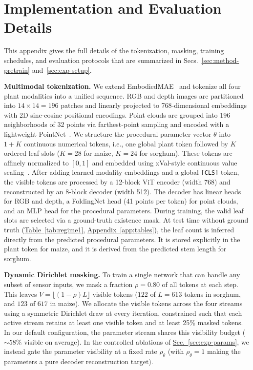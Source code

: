 \documentclass[10pt,twocolumn,letterpaper]{article}
\newcommand{\tabref}[1]{\hyperref[#1]{Table~\ref*{#1}}}
\newcommand{\secref}[1]{\hyperref[#1]{Sec.~\ref*{#1}}}
\newcommand{\appendixref}[1]{\hyperref[#1]{Appendix~\ref*{#1}}}
\begin{document}
\section{Implementation and Evaluation Details}
\label{app:impl}

This appendix gives the full details of the tokenization, masking, training schedules, and evaluation protocols that are summarized in \textcolor{cvprblue}{Secs.}~\ref{sec:method-pretrain} and~\ref{sec:exp-setup}.

\noindent\textbf{Multimodal tokenization.}
We extend EmbodiedMAE~\citep{dong2025embodiedmae} and tokenize all four plant modalities into a unified sequence. RGB and depth images are partitioned into $14 \times 14 = 196$ patches and linearly projected to 768-dimensional embeddings with 2D sine-cosine positional encodings. Point clouds are grouped into 196 neighborhoods of 32 points via farthest-point sampling and encoded with a lightweight PointNet~\citep{pang2022pointmae,qi2017pointnet}. We structure the procedural parameter vector $\theta$ into $1 + K$ continuous numerical tokens, i.e., one global plant token followed by $K$ ordered leaf slots ($K = 28$ for maize, $K = 24$ for sorghum). These tokens are affinely normalized to $[0,1]$ and embedded using xVal-style continuous value scaling~\citep{golkar2023xval}. After adding learned modality embeddings and a global \texttt{[CLS]} token, the visible tokens are processed by a 12-block ViT encoder (width 768) and reconstructed by an 8-block decoder (width 512). The decoder has linear heads for RGB and depth, a FoldingNet head (41 points per token) for point clouds, and an MLP head for the procedural parameters. During training, the valid leaf slots are selected via a ground-truth existence mask. At test time without ground truth (\tabref{tab:regime1}, \appendixref{app:tables}), the leaf count is inferred directly from the predicted procedural parameters. It is stored explicitly in the plant token for maize, and it is derived from the predicted stem length for sorghum.

\noindent\textbf{Dynamic Dirichlet masking.}
To train a single network that can handle any subset of sensor inputs, we mask a fraction $\rho = 0.80$ of all tokens at each step. This leaves $V = \lfloor (1-\rho)L \rfloor$ visible tokens ($122$ of $L = 613$ tokens in sorghum, and $123$ of $617$ in maize). We allocate the visible tokens across the four streams using a symmetric Dirichlet draw at every iteration, constrained such that each active stream retains at least one visible token and at least 25\% masked tokens. In our default configuration, the parameter stream shares this visibility budget ($\sim 58\%$ visible on average). In the controlled ablations of \secref{sec:exp-params}, we instead gate the parameter visibility at a fixed rate $\rho_\theta$ (with $\rho_\theta = 1$ making the parameters a pure decoder reconstruction target).
\end{document}
